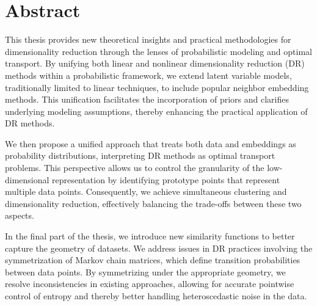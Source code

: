 \newpage
\section*{Abstract}

This thesis provides new theoretical insights and practical methodologies for dimensionality reduction through the lenses of probabilistic modeling and optimal transport. By unifying both linear and nonlinear dimensionality reduction (DR) methods within a probabilistic framework, we extend latent variable models, traditionally limited to linear techniques, to include popular neighbor embedding methods. This unification facilitates the incorporation of priors and clarifies underlying modeling assumptions, thereby enhancing the practical application of DR methods.

We then propose a unified approach that treats both data and embeddings as probability distributions, interpreting DR methods as optimal transport problems. This perspective allows us to control the granularity of the low-dimensional representation by identifying prototype points that represent multiple data points. Consequently, we achieve simultaneous clustering and dimensionality reduction, effectively balancing the trade-offs between these two aspects.

In the final part of the thesis, we introduce new similarity functions to better capture the geometry of datasets. We address issues in DR practices involving the symmetrization of Markov chain matrices, which define transition probabilities between data points. By symmetrizing under the appropriate geometry, we resolve inconsistencies in existing approaches, allowing for accurate pointwise control of entropy and thereby better handling heteroscedastic noise in the data.